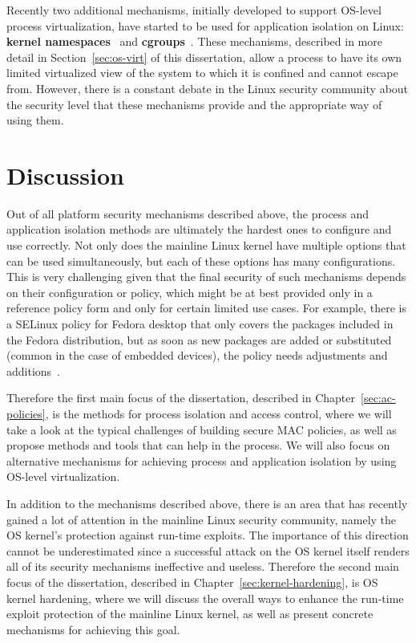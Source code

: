 Recently two additional mechanisms, initially developed to support OS-level process virtualization, have started to be used for application isolation on Linux: \textbf{kernel namespaces}~\cite{biederman2006} and \textbf{cgroups}~\cite{cgroupsv2}. These mechanisms, described in more detail in Section~\ref{sec:os-virt} of this dissertation, allow a process to have its own limited virtualized view of the system to which it is confined and cannot escape from. However, there is a constant debate in the Linux security community about the security level that these mechanisms provide and the appropriate way of using them.   

\section{Discussion}

Out of all platform security mechanisms described above, the process and application isolation methods are ultimately the hardest ones to configure and use correctly. Not only does the mainline Linux kernel have multiple options that can be used simultaneously, but each of these options has many configurations. This is very challenging given that the final security of such mechanisms depends on their configuration or policy, which might be at best provided only in a reference policy form and only for certain limited use cases. For example, there is a SELinux policy for Fedora desktop that only covers the packages included in the Fedora distribution, but as soon as new packages are added or substituted (common in the case of embedded devices), the policy needs adjustments and additions~\cite{selinux-fedora}. 

Therefore the first main focus of the dissertation, described in Chapter~\ref{sec:ac-policies}, is the methods for process isolation and access control, where we will take a look at the typical challenges of building secure MAC policies, as well as propose methods and tools that can help in the process. We will also focus on alternative mechanisms for achieving process and application isolation by using OS-level virtualization. 

In addition to the mechanisms described above, there is an area that has recently gained a lot of attention in the mainline Linux security community, namely the OS kernel's protection against run-time exploits. The importance of this direction cannot be underestimated since a successful attack on the OS kernel itself renders all of its security mechanisms ineffective and useless. Therefore the second main focus of the dissertation, described in Chapter~\ref{sec:kernel-hardening}, is OS kernel hardening, where we will discuss the overall ways to enhance the run-time exploit protection of the mainline Linux kernel, as well as present concrete mechanisms for achieving this goal. 
 